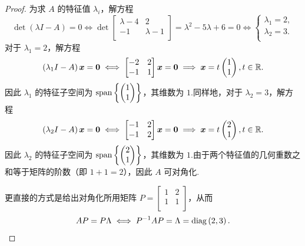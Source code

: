\begin{proof}
为求 $A$ 的特征值 $\lambda_i$，解方程
\[
\det \left(\lambda I - A\right) = 0 \iff \det \begin{bmatrix}
    \lambda - 4 & 2 \\
    -1 & \lambda - 1 \\
\end{bmatrix} = \lambda^2 - 5 \lambda + 6 = 0 \iff \begin{cases}
    \lambda_1 = 2, \\
    \lambda_2 = 3. \\
\end{cases}
\]
对于 $\lambda_1 = 2$，解方程
\[
\left(\lambda_1 I - A\right) \boldsymbol{x} = \boldsymbol{0} \iff \begin{bmatrix}
    -2 & 2 \\
    -1 & 1 \\
\end{bmatrix} \boldsymbol{x} = \boldsymbol{0} \implies \boldsymbol{x} = t \begin{pmatrix}
    1 \\
    1 \\
\end{pmatrix}, t \in \mathbb{R}.
\]因此 $\lambda_1$ 的特征子空间为 $\mathrm{span} \left\{\begin{pmatrix}
    1 \\
    1 \\
\end{pmatrix}\right\}$，其维数为 $1$.同样地，对于 $\lambda_2 = 3$，解方程
\[
\left(\lambda_2 I - A\right) \boldsymbol{x} = \boldsymbol{0} \iff \begin{bmatrix}
    -1 & 2 \\
    -1 & 2 \\
\end{bmatrix} \boldsymbol{x} = \boldsymbol{0} \implies \boldsymbol{x} = t \begin{pmatrix}
    2 \\
    1 \\
\end{pmatrix}, t \in \mathbb{R}.
\]因此 $\lambda_2$ 的特征子空间为 $\mathrm{span} \left\{\begin{pmatrix}
    2 \\
    1 \\
\end{pmatrix}\right\}$，其维数为 $1$.由于两个特征值的几何重数之和等于矩阵的阶数（即 $1 + 1 = 2$），因此 $\boxed{A \text{ 可对角化}}$.

更直接的方式是给出对角化所用矩阵 $P = \begin{bmatrix}
    1 & 2 \\
    1 & 1 \\
\end{bmatrix}$，从而
\[
AP = P \Lambda \iff P^{-1}AP = \Lambda = \mathrm{diag} \left(2, 3\right).
\]
\end{proof}
